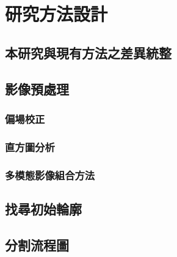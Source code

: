 
\chapter{研究方法設計}

\section{本研究與現有方法之差異統整}


\section{影像預處理}
\subsection{偏場校正}
\subsection{直方圖分析}
\subsection{多模態影像組合方法}


\section{找尋初始輪廓}


\section{分割流程圖}
